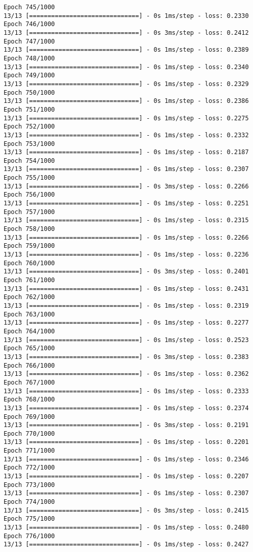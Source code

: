 \documentclass[11pt]{article}
\begin{document}
\begin{Verbatim}[commandchars=\\\{\}]
Epoch 745/1000
13/13 [==============================] - 0s 1ms/step - loss: 0.2330
Epoch 746/1000
13/13 [==============================] - 0s 3ms/step - loss: 0.2412
Epoch 747/1000
13/13 [==============================] - 0s 1ms/step - loss: 0.2389
Epoch 748/1000
13/13 [==============================] - 0s 1ms/step - loss: 0.2340
Epoch 749/1000
13/13 [==============================] - 0s 1ms/step - loss: 0.2329
Epoch 750/1000
13/13 [==============================] - 0s 1ms/step - loss: 0.2386
Epoch 751/1000
13/13 [==============================] - 0s 1ms/step - loss: 0.2275
Epoch 752/1000
13/13 [==============================] - 0s 1ms/step - loss: 0.2332
Epoch 753/1000
13/13 [==============================] - 0s 1ms/step - loss: 0.2187
Epoch 754/1000
13/13 [==============================] - 0s 1ms/step - loss: 0.2307
Epoch 755/1000
13/13 [==============================] - 0s 3ms/step - loss: 0.2266
Epoch 756/1000
13/13 [==============================] - 0s 1ms/step - loss: 0.2251
Epoch 757/1000
13/13 [==============================] - 0s 1ms/step - loss: 0.2315
Epoch 758/1000
13/13 [==============================] - 0s 1ms/step - loss: 0.2266
Epoch 759/1000
13/13 [==============================] - 0s 1ms/step - loss: 0.2236
Epoch 760/1000
13/13 [==============================] - 0s 3ms/step - loss: 0.2401
Epoch 761/1000
13/13 [==============================] - 0s 1ms/step - loss: 0.2431
Epoch 762/1000
13/13 [==============================] - 0s 1ms/step - loss: 0.2319
Epoch 763/1000
13/13 [==============================] - 0s 1ms/step - loss: 0.2277
Epoch 764/1000
13/13 [==============================] - 0s 1ms/step - loss: 0.2523
Epoch 765/1000
13/13 [==============================] - 0s 3ms/step - loss: 0.2383
Epoch 766/1000
13/13 [==============================] - 0s 1ms/step - loss: 0.2362
Epoch 767/1000
13/13 [==============================] - 0s 1ms/step - loss: 0.2333
Epoch 768/1000
13/13 [==============================] - 0s 1ms/step - loss: 0.2374
Epoch 769/1000
13/13 [==============================] - 0s 3ms/step - loss: 0.2191
Epoch 770/1000
13/13 [==============================] - 0s 1ms/step - loss: 0.2201
Epoch 771/1000
13/13 [==============================] - 0s 1ms/step - loss: 0.2346
Epoch 772/1000
13/13 [==============================] - 0s 1ms/step - loss: 0.2207
Epoch 773/1000
13/13 [==============================] - 0s 1ms/step - loss: 0.2307
Epoch 774/1000
13/13 [==============================] - 0s 3ms/step - loss: 0.2415
Epoch 775/1000
13/13 [==============================] - 0s 1ms/step - loss: 0.2480
Epoch 776/1000
13/13 [==============================] - 0s 1ms/step - loss: 0.2427

\end{Verbatim}
\end{document}
